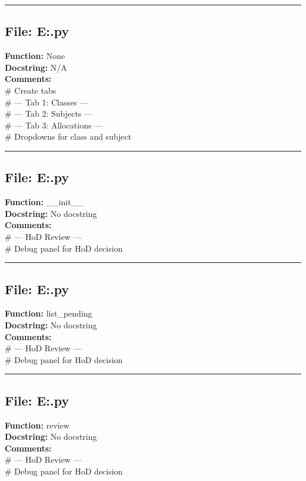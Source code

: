 {\hrule

\subsection*{File: E:\project\capstone\frontend\hod\CSUB.py}
\textbf{Function:} None\\
\textbf{Docstring:} N/A\\
\textbf{Comments:}\\
# Create tabs\\
# --- Tab 1: Classes ---\\
# --- Tab 2: Subjects ---\\
# --- Tab 3: Allocations ---\\
# Dropdowns for class and subject\\

\hrule

\subsection*{File: E:\project\capstone\frontend\hod\decision.py}
\textbf{Function:} __init__\\
\textbf{Docstring:} No docstring\\
\textbf{Comments:}\\
# --- HoD Review ---\\
# Debug panel for HoD decision\\

\hrule

\subsection*{File: E:\project\capstone\frontend\hod\decision.py}
\textbf{Function:} list_pending\\
\textbf{Docstring:} No docstring\\
\textbf{Comments:}\\
# --- HoD Review ---\\
# Debug panel for HoD decision\\

\hrule

\subsection*{File: E:\project\capstone\frontend\hod\decision.py}
\textbf{Function:} review\\
\textbf{Docstring:} No docstring\\
\textbf{Comments:}\\
# --- HoD Review ---\\
# Debug panel for HoD decision\\

}
